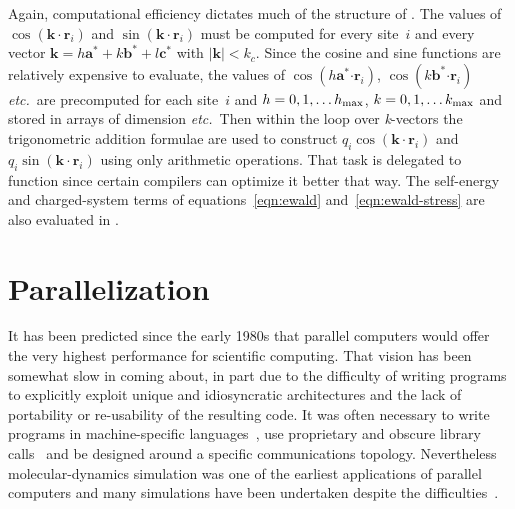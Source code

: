 \documentclass[a4paper,twoside]{report}
\providecommand{\bm}[1]{\mathbf{#1}}
\newcommand{\etc}{\emph{etc.}}
\begin{document}
Again, computational efficiency dictates much of the structure of
.  The values of $\cos(\bm{k \cdot r}_i)$ and $\sin(\bm{k
  \cdot r}_i)$ must be computed for every site~$i$ and every vector
$\bm{k} = h \bm{a}^* + k \bm{b}^* + l \bm{c}^*$ with $|\bm{k}| < k_c$.
Since the cosine and sine functions are relatively expensive to
evaluate, the values of $\cos(h \bm{a}^*\bm{ \cdot r}_i)$, $\cos(k
\bm{b}^*\bm{ \cdot r}_i)$ \etc\ are precomputed for each site~$i$ and
$h = 0, 1, \ldots h_{\textnormal{max}}$, $k = 0, 1, \ldots
k_{\textnormal{max}}$ and stored in arrays of dimension
\Lit{[hmax][nsites]} \etc\ Then within the loop over \emph{k}-vectors
the trigonometric addition formulae are used to construct $q_i
\cos(\bm{k \cdot r}_i)$ and $q_i \sin(\bm{k \cdot r}_i)$ using only
arithmetic operations.  That task is delegated to function
 since certain compilers can optimize it better that
way.  The self-energy and charged-system terms of
equations~\ref{eqn:ewald} and~\ref{eqn:ewald-stress} are also
evaluated in .

\section{Parallelization}%
It has been predicted since the early 1980s that parallel computers
would offer the very highest performance for scientific computing.
That vision has been somewhat slow in coming about, in part due to the
difficulty of writing programs to explicitly exploit unique and
idiosyncratic architectures and the lack of portability or
re-usability of the resulting code.  It was often necessary to write
programs in machine-specific languages~\cite{pawley:82,bowler:87}, use
proprietary and obscure library calls~\cite{clementi:85} and be
designed around a specific communications topology.  Nevertheless
molecular-dynamics simulation was one of the earliest applications of
parallel computers and many simulations have been undertaken despite
the difficulties~\cite{pawley:82,clementi:85,rapaport:88}.
\end{document}
